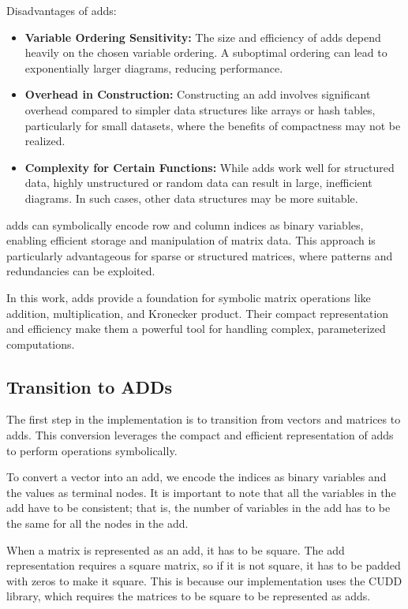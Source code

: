 Disadvantages of \glspl{add}:
\begin{itemize}
\item \textbf{Variable Ordering Sensitivity:} The size and efficiency of \glspl{add} depend heavily on the chosen variable ordering. A suboptimal ordering can lead to exponentially larger diagrams, reducing performance.
\item \textbf{Overhead in Construction:} Constructing an \gls{add} involves significant overhead compared to simpler data structures like arrays or hash tables, particularly for small datasets, where the benefits of compactness may not be realized.
\item \textbf{Complexity for Certain Functions:} While \glspl{add} work well for structured data, highly unstructured or random data can result in large, inefficient diagrams. In such cases, other data structures may be more suitable.
\end{itemize}

\glspl{add} can symbolically encode row and column indices as binary variables, enabling efficient storage and manipulation of matrix data.
This approach is particularly advantageous for sparse or structured matrices, where patterns and redundancies can be exploited.

In this work, \glspl{add} provide a foundation for symbolic matrix operations like addition, multiplication, and Kronecker product. Their compact representation and efficiency make them a powerful tool for handling complex, parameterized computations.

\subsection{Transition to ADDs}\label{subsec:transition-to-adds}
The first step in the implementation is to transition from vectors and matrices to \glspl{add}.
This conversion leverages the compact and efficient representation of \glspl{add} to perform operations symbolically.

To convert a vector into an \gls{add}, we encode the indices as binary variables and the values as terminal nodes.
It is important to note that all the variables in the \gls{add} have to be consistent; that is, the number of variables in the \gls{add} has to be the same for all the nodes in the \gls{add}.

When a matrix is represented as an \gls{add}, it has to be square. The \gls{add} representation requires a square matrix, so if it is not square, it has to be padded with zeros to make it square.
This is because our implementation uses the CUDD library, which requires the matrices to be square to be represented as \glspl{add}.


